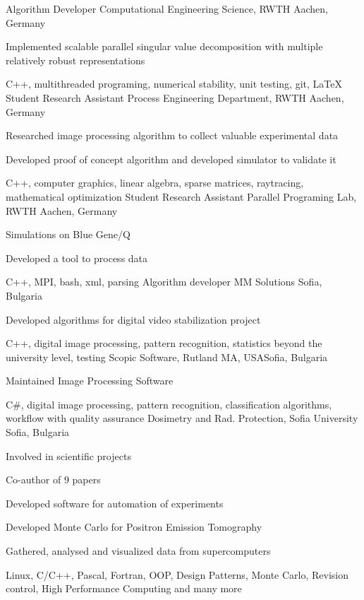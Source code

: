 {Algorithm Developer}
{Computational Engineering Science, RWTH}
{Aachen, Germany}
{ \item Implemented scalable parallel singular value decomposition with multiple relatively robust representations}
{C++, multithreaded programing, numerical stability, unit testing, git, \LaTeX}
{Student Research Assistant} 
{Process Engineering Department, RWTH}
{Aachen, Germany}
{ \item Researched image processing algorithm to collect valuable experimental data}
{ 
\item Developed proof of concept algorithm and developed simulator to validate it}
{C++, computer graphics, linear algebra, sparse matrices, raytracing, mathematical optimization}
{Student Research Assistant}
{Parallel Programing Lab, RWTH}
{Aachen, Germany}
{\item Simulations on Blue Gene/Q}
{\item Developed a tool to process data}
{ C++, MPI, bash, xml, parsing}
{Algorithm developer}
{MM Solutions}
{Sofia, Bulgaria}
{ \item Developed algorithms for digital video stabilization project}
{C++, digital image processing, pattern recognition, statistics beyond the university level, testing}
{Scopic Software, Rutland MA, USA}{Sofia, Bulgaria}
{\item Maintained Image Processing Software}
{C\#, digital image processing, pattern recognition, classification algorithms, workflow with quality assurance}
{Dosimetry and Rad. Protection, Sofia University} {Sofia, Bulgaria}
{
 \item Involved in scientific projects 
 \item Co-author of 9 papers
 \item Developed software for automation of experiments
}
{ 
 \item Developed Monte Carlo for Positron Emission Tomography
 \item Gathered, analysed and visualized data from supercomputers
}
{Linux, C/C++, Pascal, Fortran, OOP, Design Patterns, Monte Carlo, Revision control, High Performance Computing and many more}
